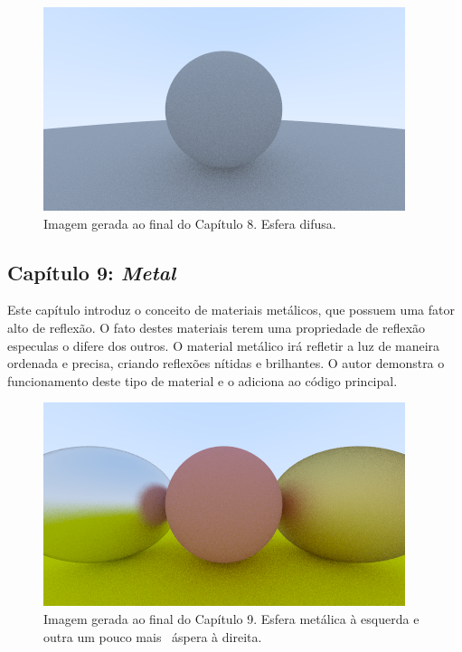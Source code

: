 \documentclass[journal]{IEEEtran}
\begin{document}
\begin{figure}[ht]
  \centering
  \includegraphics[width=\linewidth]{media/img-1.10-rand-hemispherical.png}
  \caption{Imagem gerada ao final do Capítulo 8. Esfera difusa.}
  \label{img_difuse}
\end{figure}


\subsection*{Capítulo 9: \emph{Metal}}
Este capítulo introduz o conceito de materiais metálicos, que possuem uma fator alto de reflexão. O fato
destes materiais terem uma propriedade de reflexão especulas o difere dos outros. O material metálico
irá refletir a luz de maneira ordenada e precisa, criando reflexões nítidas e brilhantes. O autor demonstra
o funcionamento deste tipo de material e o adiciona ao código principal.

\begin{figure}[ht]
  \centering
  \includegraphics[width=\linewidth]{media/img-1.12-metal-fuzz.png}
  \caption{Imagem gerada ao final do Capítulo 9. Esfera metálica à esquerda e outra um pouco mais \
  áspera à direita.}
  \label{img_metal}
\end{figure}
\end{document}
